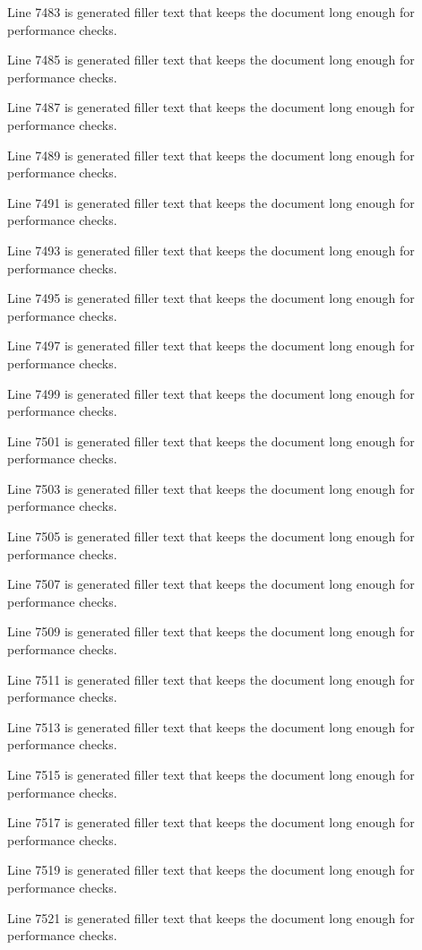 Line 7483 is generated filler text that keeps the document long enough for performance checks.

Line 7485 is generated filler text that keeps the document long enough for performance checks.

Line 7487 is generated filler text that keeps the document long enough for performance checks.

Line 7489 is generated filler text that keeps the document long enough for performance checks.

Line 7491 is generated filler text that keeps the document long enough for performance checks.

Line 7493 is generated filler text that keeps the document long enough for performance checks.

Line 7495 is generated filler text that keeps the document long enough for performance checks.

Line 7497 is generated filler text that keeps the document long enough for performance checks.

Line 7499 is generated filler text that keeps the document long enough for performance checks.

Line 7501 is generated filler text that keeps the document long enough for performance checks.

Line 7503 is generated filler text that keeps the document long enough for performance checks.

Line 7505 is generated filler text that keeps the document long enough for performance checks.

Line 7507 is generated filler text that keeps the document long enough for performance checks.

Line 7509 is generated filler text that keeps the document long enough for performance checks.

Line 7511 is generated filler text that keeps the document long enough for performance checks.

Line 7513 is generated filler text that keeps the document long enough for performance checks.

Line 7515 is generated filler text that keeps the document long enough for performance checks.

Line 7517 is generated filler text that keeps the document long enough for performance checks.

Line 7519 is generated filler text that keeps the document long enough for performance checks.

Line 7521 is generated filler text that keeps the document long enough for performance checks.

